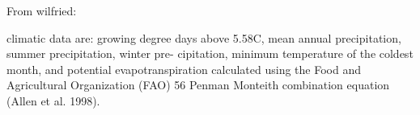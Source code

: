 From wilfried:

climatic data are: growing degree days above 5.58C, mean annual precipitation, summer precipitation, winter pre- cipitation, minimum temperature of the coldest month, and potential evapotranspiration calculated using the Food and Agricultural Organization (FAO) 56 Penman Monteith combination equation (Allen et al. 1998).
